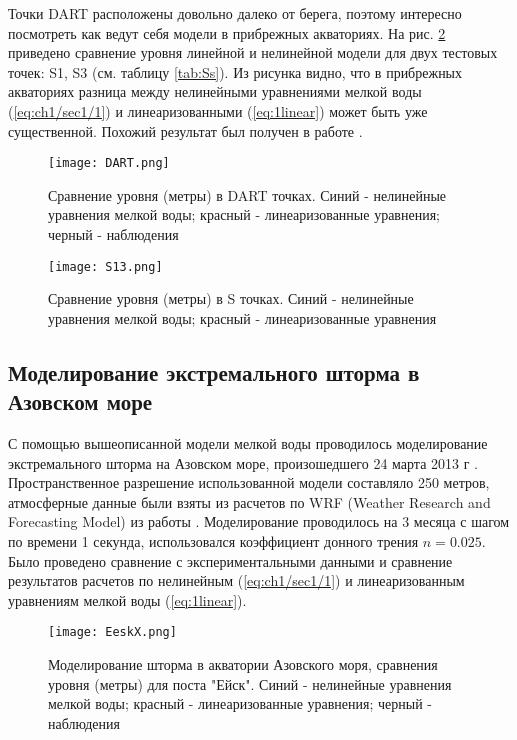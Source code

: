 Точки DART расположены довольно далеко от берега, поэтому интересно посмотреть как ведут себя модели в прибрежных акваториях. На рис. \ref{fig:S13} приведено сравнение уровня линейной и нелинейной модели для двух тестовых точек: S1, S3 (см. таблицу \ref{tab:Ss}). Из рисунка видно, что в прибрежных акваториях разница между нелинейными уравнениями мелкой воды (\ref{eq:ch1/sec1/1}) и линеаризованными (\ref{eq:1linear}) может быть уже существенной. Похожий результат был получен в работе \cite{Liu2009}.

\begin{figure}[htb!]
	\center
	\texttt{[image: DART.png]}
	\caption{Сравнение уровня (метры) в DART точках. Синий - нелинейные уравнения мелкой воды; красный - линеаризованные уравнения; черный - наблюдения}
	\label{fig:DART}
\end{figure}
	
\begin{figure}[htb!]
	\center
	\texttt{[image: S13.png]}
	\caption{Сравнение уровня (метры) в S точках. Синий - нелинейные уравнения мелкой воды; красный - линеаризованные уравнения}
	\label{fig:S13}
\end{figure}

\subsection{Моделирование экстремального шторма в Азовском море}

С помощью вышеописанной модели мелкой воды проводилось моделирование экстремального шторма на Азовском море, произошедшего 24 марта 2013 г \cite{MARESEDU}.
Пространственное разрешение использованной модели составляло 250 метров,
атмосферные данные были взяты из расчетов по WRF (Weather Research and Forecasting
Model) из работы \cite{AzovStorm}. 
Моделирование проводилось на 3 месяца с шагом по времени 1 секунда, использовался коэффициент донного трения $n = 0.025$.
Было проведено сравнение с экспериментальными данными и сравнение результатов расчетов по нелинейным (\ref{eq:ch1/sec1/1}) и линеаризованным уравнениям мелкой воды (\ref{eq:1linear}).

\begin{figure}[htb!]
	\center
	\texttt{[image: EeskX.png]}
	\caption{Моделирование шторма в акватории Азовского моря, сравнения уровня (метры) для поста "Ейск". 
		 Синий - нелинейные уравнения мелкой воды; красный - линеаризованные уравнения; черный - наблюдения}
	\label{fig:AS_Eesk}
\end{figure}
	
